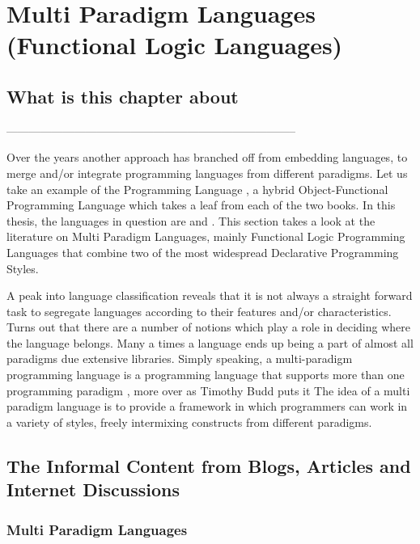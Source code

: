 \documentclass[thesis-solanki.tex]{subfiles}
\begin{document}
\chapter{Multi Paradigm Languages (Functional Logic Languages)}\label{chap:multiparadigm}


\section{What is this chapter about}

-----------------------------------------------------------------------------


Over the years another approach has branched off from embedding languages, to merge and/or integrate programming
languages from different paradigms.
Let us take an example of the  Programming Language \cite{website:scala}, a hybrid
Object-Functional Programming Language which takes a leaf from each of the two books.
In this thesis, the languages in question are  and .
This section takes a look at the literature on Multi Paradigm Languages, mainly Functional Logic Programming
Languages that combine two of the most widespread Declarative Programming Styles.

A peak into language classification reveals that it is not always a straight forward task to segregate languages
according to their features and/or characteristics.
Turns out that there are a number of notions which play a role in deciding where the language belongs.
Many a times a language ends up being a part of almost all paradigms due extensive libraries.
Simply speaking, a multi-paradigm programming language is a programming language that supports more than one
programming paradigm \cite{Krishnamurthi:2008:TPL:1480828.1480846}, more over as Timothy Budd puts it
\cite{website:wikimultiparadigm} The idea of a multi paradigm language is to provide a framework in
which programmers can work in a variety of styles, freely intermixing constructs from different
paradigms.


\section{The Informal Content from Blogs, Articles and Internet Discussions}
  
\subsection{Multi Paradigm Languages}
\end{document}
